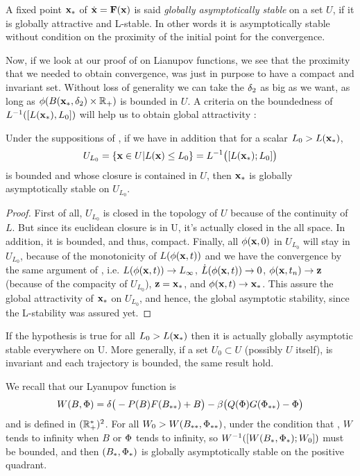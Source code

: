 \begin{definition}
    A fixed point $\xx_*$ of $\bdotx=\mathbf{F}(\mathbf{x})$ is said \emph{globally asymptotically stable} on a set $U$, if it is globally attractive and L-stable. In other words it is asymptotically stable without condition on the proximity of the initial point for the convergence.
\end{definition}
Now, if we look at our proof of  on Lianupov functions, we see that the proximity that we needed to obtain convergence, was just in purpose to have a compact and invariant set. Without loss of generality we can take the $\d_2$ as big as we want, as long as $\phi(B(\xx_*,\d_2)\times\R_+)$ is bounded in $U$. A criteria on the boundedness of $L^{-1}([L(\xx_*),L_0])$ will help us to obtain global attractivity :
\begin{corollaire}
Under the suppositions of , if we have in addition that for a scalar $L_0>L(\xx_*)$,
\[ U_{L_0} = \{ \xx\in U | L(\xx) \leq L_0\} = L^{-1}\big([L(\xx_*);L_0]\big) \]
is bounded and whose closure is contained in $U$, then $\xx_*$ is globally asymptotically stable on $U_{L_0}$.
\end{corollaire}
\begin{proof}
First of all, $U_{L_0}$ is closed in the topology of $U$ because of the continuity of $L$. But since its euclidean closure is in U, it's actually closed in the all space. In addition, it is bounded, and thus, compact. Finally, all $\phi(\xx,0)$ in $U_{L_0}$ will stay in $U_{L_0}$, because of the monotonicity of $L(\phi(\xx,t))$ and we have the convergence by the same argument of , i.e. $L(\phi(\xx,t))\to L_\infty$, $\dot{L}(\phi(\xx,t))\to 0$, $\phi(\xx,t_n)\to \zz$ (because of the compacity of $U_{L_0}$), $\zz=\xx_*$, and $\phi(\xx,t)\to \xx_*$. This assure the global attractivity of $\xx_*$ on $U_{L_0}$, and hence, the global asymptotic stability, since the L-stability was assured yet.
\end{proof}

\begin{remarque}
If the hypothesis is true for all $L_0>L(\xx_*)$ then it is actually globally asymptotic stable everywhere on U. More generally, if a set $U_0\subset U$ (possibly $U$ itself), is invariant and each trajectory is bounded, the same result hold.
\end{remarque}
We recall that our Lyanupov function is 
\[W(B,\P) = \d \big(-P(B)F(\Bstar) + B\big) 
-\b\big(Q(\P) G(\Pstar)-\P\big)\]
and is defined in $(\R^*_+)^2$. For all $W_0>W(\Bstar,\Pstar)$, under the condition that , $W$ tends to infinity when $B$ or $\P$ tends to infinity, so $W^{-1}([W(B_*,\P_*);W_0])$ must be bounded, and then $(B_*,\P_*)$ is globally asymptotically stable on the positive quadrant.